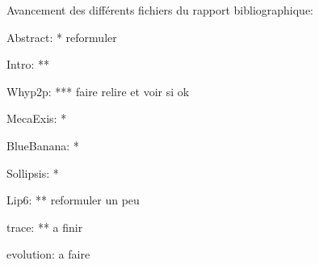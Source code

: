 Avancement des différents fichiers du rapport bibliographique:

Abstract: * reformuler 

Intro: **
 
Whyp2p: *** faire relire et voir si ok

MecaExis: *

BlueBanana: *

Sollipsis: *

Lip6: ** reformuler un peu

trace: ** a finir

evolution: a faire
